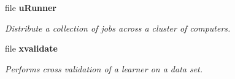 \begin{CompactItemize}
\item 
file {\bf u\-Runner}
\begin{CompactList}\small\item\em Distribute a collection of jobs across a cluster of computers. \item\end{CompactList}

\item 
file {\bf xvalidate}
\begin{CompactList}\small\item\em Performs cross validation of a learner on a data set. \item\end{CompactList}

\end{CompactItemize}

